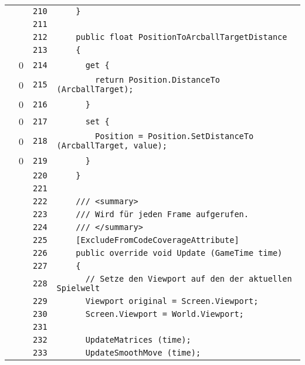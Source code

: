 \documentclass[a4paper,10pt]{article}
\begin{document}
\begin{longtable}[l]{lrrl}
\cellcolor{gray} &  & \verb~210~ & \verb~    }~\\
\cellcolor{gray} &  & \verb~211~ & \verb~~\\
\cellcolor{gray} &  & \verb~212~ & \verb~    public float PositionToArcballTargetDistance~\\
\cellcolor{gray} &  & \verb~213~ & \verb~    {~\\
\cellcolor{red} & 0 & \verb~214~ & \verb~      get {~\\
\cellcolor{red} & 0 & \verb~215~ & \verb~        return Position.DistanceTo (ArcballTarget);~\\
\cellcolor{red} & 0 & \verb~216~ & \verb~      }~\\
\cellcolor{red} & 0 & \verb~217~ & \verb~      set {~\\
\cellcolor{red} & 0 & \verb~218~ & \verb~        Position = Position.SetDistanceTo (ArcballTarget, value);~\\
\cellcolor{red} & 0 & \verb~219~ & \verb~      }~\\
\cellcolor{gray} &  & \verb~220~ & \verb~    }~\\
\cellcolor{gray} &  & \verb~221~ & \verb~~\\
\cellcolor{gray} &  & \verb~222~ & \verb~    /// <summary>~\\
\cellcolor{gray} &  & \verb~223~ & \verb~    /// Wird für jeden Frame aufgerufen.~\\
\cellcolor{gray} &  & \verb~224~ & \verb~    /// </summary>~\\
\cellcolor{gray} &  & \verb~225~ & \verb~    [ExcludeFromCodeCoverageAttribute]~\\
\cellcolor{gray} &  & \verb~226~ & \verb~    public override void Update (GameTime time)~\\
\cellcolor{gray} &  & \verb~227~ & \verb~    {~\\
\cellcolor{gray} &  & \verb~228~ & \verb~      // Setze den Viewport auf den der aktuellen Spielwelt~\\
\cellcolor{gray} &  & \verb~229~ & \verb~      Viewport original = Screen.Viewport;~\\
\cellcolor{gray} &  & \verb~230~ & \verb~      Screen.Viewport = World.Viewport;~\\
\cellcolor{gray} &  & \verb~231~ & \verb~~\\
\cellcolor{gray} &  & \verb~232~ & \verb~      UpdateMatrices (time);~\\
\cellcolor{gray} &  & \verb~233~ & \verb~      UpdateSmoothMove (time);~\\

\end{longtable}
\end{document}
